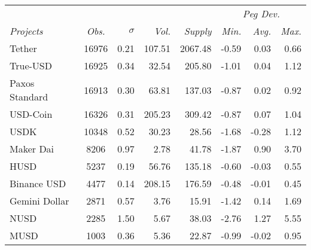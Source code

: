 \begin{tabular}{lcrrrrrr}
  \toprule
  \multicolumn{2}{l}{ } & \multicolumn{3}{c}{} & \multicolumn{3}{c}{\emph{Peg Dev.}} \\  \emph{Projects} & \emph{Obs.} & $\sigma$ & \emph{Vol.} & \emph{Supply} & \emph{Min.} & \emph{Avg.} & \emph{Max.} \\ \midrule
Tether & 16976 & 0.21 & 107.51 & 2067.48 & -0.59 & 0.03 & 0.66 \\ 
  True-USD & 16925 & 0.34 & 32.54 & 205.80 & -1.01 & 0.04 & 1.12 \\ 
  Paxos Standard & 16913 & 0.30 & 63.81 & 137.03 & -0.87 & 0.02 & 0.92 \\ 
  USD-Coin & 16326 & 0.31 & 205.23 & 309.42 & -0.87 & 0.07 & 1.04 \\ 
  USDK & 10348 & 0.52 & 30.23 & 28.56 & -1.68 & -0.28 & 1.12 \\ 
  Maker Dai & 8206 & 0.97 & 2.78 & 41.78 & -1.87 & 0.90 & 3.70 \\ 
  HUSD & 5237 & 0.19 & 56.76 & 135.18 & -0.60 & -0.03 & 0.55 \\ 
  Binance USD & 4477 & 0.14 & 208.15 & 176.59 & -0.48 & -0.01 & 0.45 \\ 
  Gemini Dollar & 2871 & 0.57 & 3.76 & 15.91 & -1.42 & 0.14 & 1.69 \\ 
  NUSD & 2285 & 1.50 & 5.67 & 38.03 & -2.76 & 1.27 & 5.55 \\ 
  MUSD & 1003 & 0.36 & 5.36 & 22.87 & -0.99 & -0.02 & 0.95 \\ 
   \bottomrule
\end{tabular}
